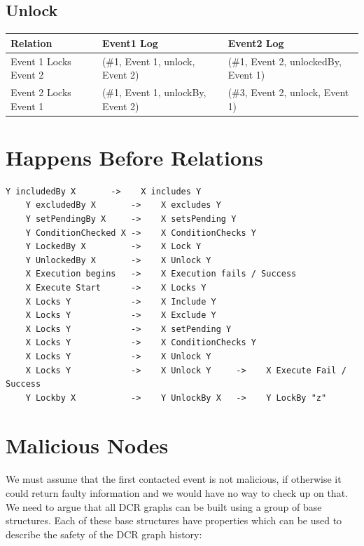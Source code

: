 \subsection{Unlock}
\begin{tabularx}{\textwidth}{|*{3}{>{\raggedright\arraybackslash}X|}}
  \hline
  Relation & Event1 Log & Event2 Log \\
  \hline
  Event 1 Locks Event 2 & (\#1, Event 1, unlock, Event 2) & (\#1, Event 2, unlockedBy, Event 1) \\
  \hline
  Event 2 Locks Event 1 & (\#1, Event 1, unlockBy, Event 2) & (\#3, Event 2, unlock, Event 1) \\
  \hline
\end{tabularx}

\section{Happens Before Relations}

\begin{lstlisting}[breaklines=true]
    Y includedBy X       ->    X includes Y
    Y excludedBy X       ->    X excludes Y
    Y setPendingBy X     ->    X setsPending Y
    Y ConditionChecked X ->    X ConditionChecks Y
    Y LockedBy X         ->    X Lock Y
    Y UnlockedBy X       ->    X Unlock Y
    X Execution begins   ->    X Execution fails / Success
    X Execute Start      ->    X Locks Y
    X Locks Y            ->    X Include Y
    X Locks Y            ->    X Exclude Y
    X Locks Y            ->    X setPending Y
    X Locks Y            ->    X ConditionChecks Y
    X Locks Y            ->    X Unlock Y
    X Locks Y            ->    X Unlock Y     ->    X Execute Fail / Success
    Y Lockby X           ->    Y UnlockBy X   ->    Y LockBy "z"
\end{lstlisting}

\section{Malicious Nodes}
We must assume that the first contacted event is not malicious, if otherwise it could return faulty information and we would have no way to check up on that.
We need to argue that all DCR graphs can be built using a group of base structures. Each of these base structures have properties which can be used to describe the safety of the DCR graph history:

